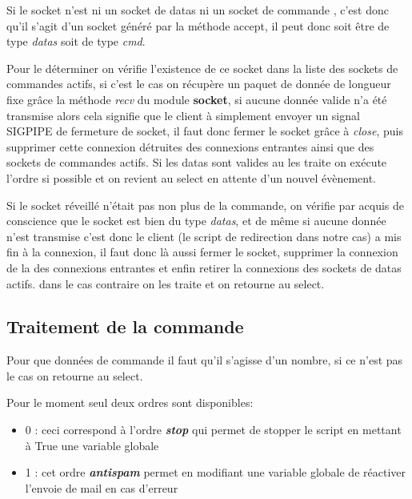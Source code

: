 Si le socket n'est ni un socket de datas ni un socket de commande , c'est donc qu'il s'agit d'un socket généré par la méthode accept, il peut donc soit être de type \textit{datas}  soit de type \textit{cmd}. 

Pour le déterminer on vérifie l'existence de ce socket dans la liste des sockets de commandes actifs, si c'est le cas on récupère un paquet de donnée de longueur fixe grâce la méthode \textit{recv} du module \textbf{socket}, si aucune donnée valide n'a été transmise alors cela signifie que le client à simplement envoyer un signal SIGPIPE de fermeture de socket, il faut donc fermer le socket grâce à \textit{close}, puis supprimer cette connexion détruites des connexions entrantes ainsi que des sockets de commandes actifs. Si les datas sont valides au les traite on exécute l'ordre si possible et on revient au select en attente d'un nouvel évènement.

Si le socket réveillé n'était pas non plus de la commande, on vérifie par acquis de conscience que le socket est bien du type \textit{datas}, et de même si aucune donnée n'est transmise c'est donc le client (le script de redirection dans notre cas) a mis fin à la connexion, il faut donc là aussi fermer le socket, supprimer la connexion de la des connexions entrantes et enfin retirer la connexions des sockets de datas actifs. dans le cas contraire on les traite et on retourne au select.

\subsection*{Traitement de la commande}
Pour que données de commande il faut qu'il s'agisse d'un nombre, si ce n'est pas le cas on retourne au select.

Pour le moment seul deux ordres sont disponibles:

\begin{itemize}
	\item 0 : ceci correspond à l'ordre \textit{\textbf{stop}} qui permet de stopper le script en mettant à True une variable globale
	\item 1 : cet ordre \textit{\textbf{antispam}} permet en modifiant une variable globale de réactiver l'envoie de mail en cas d'erreur
\end{itemize}

